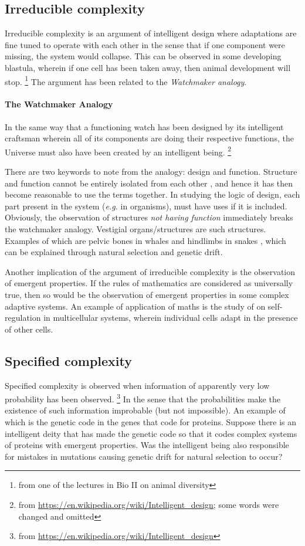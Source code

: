 \subsection{Irreducible complexity}
Irreducible complexity is an argument of intelligent design where adaptations are fine tuned to operate with each other in the sense that if one component were missing, the system would collapse.
This can be observed in some developing blastula, wherein if one cell has been taken away, then animal development will stop.
\footnote{from one of the lectures in Bio II on animal diversity}
The argument has been related to the \emph{Watchmaker analogy}.

\paragraph{The Watchmaker Analogy}
In the same way that a functioning watch has been designed by its intelligent craftsman wherein all of its components are doing their respective functions, the Universe must also have been created by an intelligent being.
\footnote{from \url{https://en.wikipedia.org/wiki/Intelligent_design}; some words were changed and omitted}

There are two keywords to note from the analogy: design and function.
Structure and function cannot be entirely isolated from each other \cite{anaphy}, and hence it has then become reasonable to use the terms together.
In studying the logic of design, each part present in the system (\textit{e.g.} in organisms), must have uses if it is included.
Obviously, the observation of structures \emph{not having function} immediately breaks the watchmaker analogy.
Vestigial organs/structures are such structures.
Examples of which are pelvic bones in whales and hindlimbs in snakes \cite{Ridley}, which can be explained through natural selection and genetic drift.

Another implication of the argument of irreducible complexity is the observation of emergent properties.
If the rules of mathematics are considered as universally true, then so would be the observation of emergent properties in some complex adaptive systems.
An example of application of maths is the study of \cite{Veloso2017} on self-regulation in multicellular systems, wherein individual cells adapt in the presence of other cells.

\subsection{Specified complexity}
Specified complexity is observed when information of apparently very low probability has been observed.
\footnote{from \url{https://en.wikipedia.org/wiki/Intelligent_design}}
In the sense that the probabilities make the existence of such information improbable (but not impossible).
An example of which is the genetic code in the genes that code for proteins.
Suppose there is an intelligent deity that has made the genetic code so that it codes complex systems of proteins with emergent properties.
Was the intelligent being also responsible for mistakes in mutations causing genetic drift for natural selection to occur?

